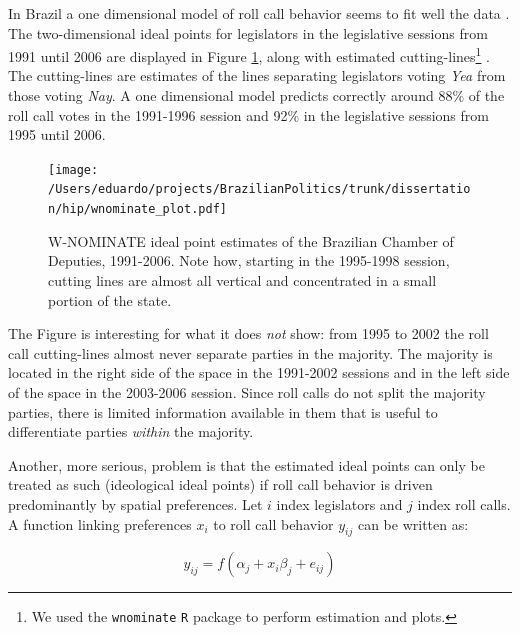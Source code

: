 In Brazil a one dimensional model of roll call behavior seems  to fit well the data \citep{leoni:2002}.  The two-dimensional ideal points  for legislators in the legislative sessions from 1991 until 2006 are displayed in Figure \ref{fig:wnominate}, along with estimated cutting-lines\footnote{We used the \texttt{wnominate} \citeyear{poole:2007} \texttt{R} package to perform estimation and plots.} . The cutting-lines are estimates of the lines separating legislators voting \emph{Yea} from those voting \emph{Nay}.  A one dimensional model predicts correctly around 88\% of the roll call votes in the 1991-1996 session and 92\% in the legislative sessions from 1995 until 2006. 

\begin{figure}
  \centering
  \texttt{[image: /Users/eduardo/projects/BrazilianPolitics/trunk/dissertation/hip/wnominate\_plot.pdf]}
  \caption{\textsc{W-NOMINATE} ideal point estimates of the Brazilian Chamber of Deputies, 1991-2006. Note how, starting in the 1995-1998 session, cutting lines are almost all vertical and concentrated in a small portion of the state.}
  \label{fig:wnominate}
\end{figure}

The Figure is interesting for what it does \emph{not} show: from 1995 to 2002 the roll call cutting-lines almost never separate parties in the majority. The majority is located in the right side of the space in the 1991-2002 sessions and in the left side of the space in the 2003-2006 session.   Since roll calls do not split the majority parties, there is limited information available in them that is useful to differentiate parties \emph{within} the majority.

Another, more serious, problem is that the estimated ideal points can only be treated as such (ideological ideal points) if  roll call behavior is driven predominantly by spatial preferences. Let $i$ index legislators and $j$ index roll calls. A function linking preferences $x_i$ to roll call behavior $y_{ij}$ can be written as:

\begin{equation}
  \label{eq:3}
  y_{ij} = f(\alpha_j+x_i\beta_j +e_{ij})
\end{equation}


